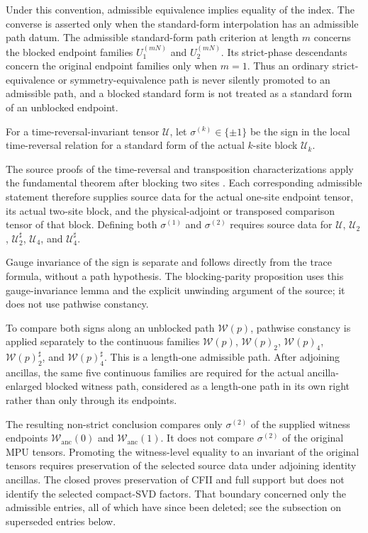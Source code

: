 \documentclass{article}
\begin{document}
Under this convention, admissible equivalence implies equality of the index.
The converse is asserted only when the standard-form interpolation has an
admissible path datum. The admissible standard-form path criterion at length
$m$ concerns the blocked endpoint families $U_1^{(mN)}$ and $U_2^{(mN)}$. Its
strict-phase descendants concern the original endpoint families only when
$m=1$. Thus an ordinary strict-equivalence or symmetry-equivalence path is
never silently promoted to an admissible path, and a blocked standard form is
not treated as a standard form of an unblocked endpoint.

For a time-reversal-invariant tensor $\mathcal U$, let
$\sigma^{(k)}\in\{\pm1\}$ be the sign in the local time-reversal relation for a
standard form of the actual $k$-site block $\mathcal U_k$.

The source proofs of the time-reversal and transposition characterizations
apply the fundamental theorem after blocking two sites
\cite{Cirac2017MPU}. Each corresponding admissible statement therefore
supplies source data for the actual one-site endpoint tensor, its actual
two-site block, and the physical-adjoint or transposed comparison tensor of
that block. Defining both $\sigma^{(1)}$ and $\sigma^{(2)}$ requires source
data for $\mathcal U$, $\mathcal U_2$, $\mathcal U_2^\sharp$,
$\mathcal U_4$, and $\mathcal U_4^\sharp$.

Gauge invariance of the sign is separate and follows directly from the trace
formula, without a path hypothesis. The blocking-parity proposition uses this
gauge-invariance lemma and the explicit unwinding argument of the source; it
does not use pathwise constancy.

To compare both signs along an unblocked path $\mathcal W(p)$, pathwise
constancy is applied separately to the continuous families
$\mathcal W(p)$, $\mathcal W(p)_2$, $\mathcal W(p)_4$,
$\mathcal W(p)_2^\sharp$, and $\mathcal W(p)_4^\sharp$. This is a length-one
admissible path. After adjoining ancillas, the same five continuous families
are required for the actual ancilla-enlarged blocked witness path, considered
as a length-one path in its own right rather than only through its endpoints.

The resulting non-strict conclusion compares only $\sigma^{(2)}$ of the
supplied witness endpoints $\mathcal W_{\mathrm{anc}}(0)$ and
$\mathcal W_{\mathrm{anc}}(1)$. It does not compare $\sigma^{(2)}$ of the
original MPU tensors. Promoting the witness-level equality to an invariant of
the original tensors requires preservation of the selected source data under
adjoining identity ancillas. The closed  proves preservation of
CFII and full support but does not identify the selected compact-SVD factors.
That boundary concerned only the admissible entries, all of which have since
been deleted; see the subsection on superseded entries below.
\end{document}
